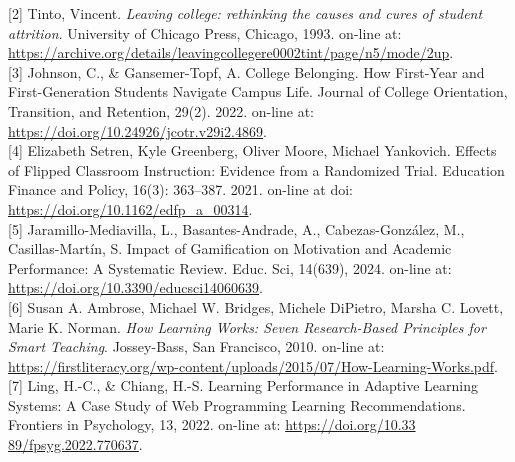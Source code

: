 \documentclass[a4paper]{article}
\begin{document}
[2] Tinto, Vincent. \textit{Leaving college: rethinking the causes and cures of student attrition}. University of Chicago Press, Chicago, 1993. on-line at: \href{https://archive.org/details/leavingcollegere0002tint/page/n5/mode/2up}{https://archive.org/details/leavingcollegere0002tint/page/n5/mode/2up}.\\


[3] 
Johnson, C., \& Gansemer-Topf, A. College Belonging. How First-Year and First-Generation Students Navigate Campus Life. Journal of College Orientation, Transition, and Retention, 29(2). 2022. on-line at: \href{https://doi.org/10.24926/jcotr.v29i2.4869}{https://doi.org/10.24926/jcotr.v29i2.4869}.\\

[4] Elizabeth Setren, Kyle Greenberg, Oliver Moore, Michael Yankovich. Effects of Flipped Classroom Instruction: Evidence from a Randomized Trial. Education Finance and Policy, 16(3): 363–387. 2021. on-line at doi: \href{https://doi.org/10.1162/edfp_a_00314}{https://doi.org/10.1162/edfp\_a\_00314}.\\

[5] Jaramillo-Mediavilla, L., Basantes-Andrade, A., Cabezas-González, M., Casillas-Martín, S. Impact of Gamification on Motivation and Academic Performance: A Systematic Review. Educ. Sci, 14(639), 2024. on-line at: \href{https://doi.org/10.3390/educsci14060639}{https://doi.org/10.3390/educsci14060639}.\\

[6] Susan A. Ambrose, Michael W. Bridges, Michele DiPietro, Marsha C. Lovett, Marie K. Norman. \textit{How Learning Works: Seven Research-Based Principles for Smart Teaching}. Jossey-Bass, San Francisco, 2010. on-line at: \href{https://firstliteracy.org/wp-content/uploads/2015/07/How-Learning-Works.pdf}{https://firstliteracy.org/wp-content/uploads/2015/07/How-Learning-Works.pdf}.\\

[7] Ling, H.-C., \& Chiang, H.-S. Learning Performance in Adaptive Learning Systems: A Case Study of Web Programming Learning Recommendations. Frontiers in Psychology, 13, 2022. on-line at: \href{https://doi.org/10.3389/fpsyg.2022.770637}{https://doi.org/10.33\\89/fpsyg.2022.770637}.
\end{document}
